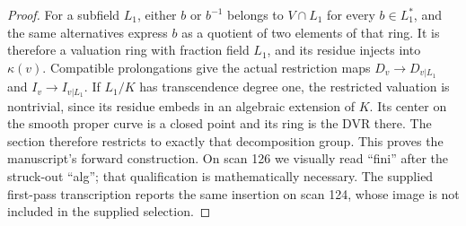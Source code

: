 \documentclass[11pt,oneside]{article}
\begin{document}
\begin{proof}
For a subfield $L_1$, either $b$ or $b^{-1}$ belongs to
$V\cap L_1$ for every $b\in L_1^*$, and the same alternatives
express $b$ as a quotient of two elements of that ring. It is
therefore a valuation ring with fraction field $L_1$, and its
residue injects into $\kappa(v)$. Compatible prolongations give
the actual restriction maps $D_v\to D_{v|L_1}$ and
$I_v\to I_{v|L_1}$. If $L_1/K$ has transcendence degree one,
the restricted valuation is nontrivial, since its residue embeds
in an algebraic extension of $K$. Its center on the smooth proper
curve is a closed point and its ring is the DVR there. The
section therefore restricts to exactly that decomposition group.
This proves the manuscript's forward construction. On scan 126
we visually read ``fini'' after the struck-out ``alg''; that
qualification is mathematically necessary. The supplied first-pass
transcription reports the same insertion on scan 124, whose image
is not included in the supplied selection.
\end{proof}
\end{document}
